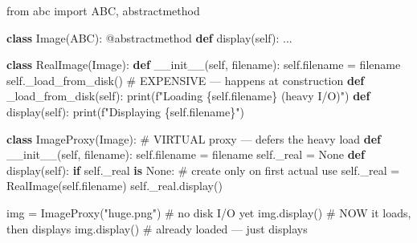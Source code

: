 \documentclass[11pt]{article}
\newenvironment{Shaded}{\begin{snugshade}}{\end{snugshade}}
\newcommand{\AttributeTok}[1]{\textcolor[rgb]{0.16,0.50,0.73}{#1}}
\newcommand{\BuiltInTok}[1]{\textcolor[rgb]{0.50,0.55,0.55}{#1}}
\newcommand{\CommentTok}[1]{\textcolor[rgb]{0.48,0.49,0.49}{#1}}
\newcommand{\ControlFlowTok}[1]{\textcolor[rgb]{0.99,0.74,0.29}{\textbf{#1}}}
\newcommand{\FunctionTok}[1]{\textcolor[rgb]{0.56,0.27,0.68}{#1}}
\newcommand{\ImportTok}[1]{\textcolor[rgb]{0.15,0.68,0.38}{#1}}
\newcommand{\KeywordTok}[1]{\textcolor[rgb]{0.81,0.81,0.76}{\textbf{#1}}}
\newcommand{\NormalTok}[1]{\textcolor[rgb]{0.81,0.81,0.76}{#1}}
\newcommand{\OperatorTok}[1]{\textcolor[rgb]{0.81,0.81,0.76}{#1}}
\newcommand{\SpecialCharTok}[1]{\textcolor[rgb]{0.24,0.68,0.91}{#1}}
\newcommand{\SpecialStringTok}[1]{\textcolor[rgb]{0.85,0.27,0.33}{#1}}
\newcommand{\StringTok}[1]{\textcolor[rgb]{0.96,0.31,0.31}{#1}}
\newcommand{\VariableTok}[1]{\textcolor[rgb]{0.15,0.68,0.68}{#1}}
\begin{document}
\begin{Shaded}
\begin{Highlighting}[]
\ImportTok{from}\NormalTok{ abc }\ImportTok{import}\NormalTok{ ABC, abstractmethod}

\KeywordTok{class}\NormalTok{ Image(ABC):}
    \AttributeTok{@abstractmethod}
    \KeywordTok{def}\NormalTok{ display(}\VariableTok{self}\NormalTok{): ...}

\KeywordTok{class}\NormalTok{ RealImage(Image):}
    \KeywordTok{def} \FunctionTok{\_\_init\_\_}\NormalTok{(}\VariableTok{self}\NormalTok{, filename):}
        \VariableTok{self}\NormalTok{.filename }\OperatorTok{=}\NormalTok{ filename}
        \VariableTok{self}\NormalTok{.\_load\_from\_disk()          }\CommentTok{\# EXPENSIVE — happens at construction}
    \KeywordTok{def}\NormalTok{ \_load\_from\_disk(}\VariableTok{self}\NormalTok{): }\BuiltInTok{print}\NormalTok{(}\SpecialStringTok{f"Loading }\SpecialCharTok{\{}\VariableTok{self}\SpecialCharTok{.}\NormalTok{filename}\SpecialCharTok{\}}\SpecialStringTok{ (heavy I/O)"}\NormalTok{)}
    \KeywordTok{def}\NormalTok{ display(}\VariableTok{self}\NormalTok{): }\BuiltInTok{print}\NormalTok{(}\SpecialStringTok{f"Displaying }\SpecialCharTok{\{}\VariableTok{self}\SpecialCharTok{.}\NormalTok{filename}\SpecialCharTok{\}}\SpecialStringTok{"}\NormalTok{)}

\KeywordTok{class}\NormalTok{ ImageProxy(Image):                 }\CommentTok{\# VIRTUAL proxy — defers the heavy load}
    \KeywordTok{def} \FunctionTok{\_\_init\_\_}\NormalTok{(}\VariableTok{self}\NormalTok{, filename):}
        \VariableTok{self}\NormalTok{.filename }\OperatorTok{=}\NormalTok{ filename}
        \VariableTok{self}\NormalTok{.\_real }\OperatorTok{=} \VariableTok{None}
    \KeywordTok{def}\NormalTok{ display(}\VariableTok{self}\NormalTok{):}
        \ControlFlowTok{if} \VariableTok{self}\NormalTok{.\_real }\KeywordTok{is} \VariableTok{None}\NormalTok{:           }\CommentTok{\# create only on first actual use}
            \VariableTok{self}\NormalTok{.\_real }\OperatorTok{=}\NormalTok{ RealImage(}\VariableTok{self}\NormalTok{.filename)}
        \VariableTok{self}\NormalTok{.\_real.display()}

\NormalTok{img }\OperatorTok{=}\NormalTok{ ImageProxy(}\StringTok{"huge.png"}\NormalTok{)   }\CommentTok{\# no disk I/O yet}
\NormalTok{img.display()                  }\CommentTok{\# NOW it loads, then displays}
\NormalTok{img.display()                  }\CommentTok{\# already loaded — just displays}
\end{Highlighting}
\end{Shaded}
\end{document}

